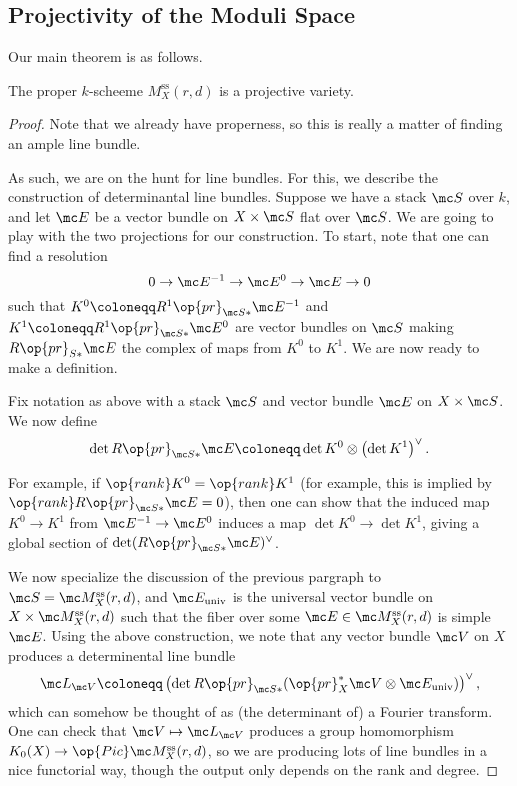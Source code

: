 \documentclass{article}
\begin{document}
\subsection{Projectivity of the Moduli Space}
Our main theorem is as follows.
\begin{theorem}
    The proper $k$-scheeme $M_X^{\mathrm{ss}}(r,d)$ is a projective variety.
\end{theorem}
\begin{proof}
    Note that we already have properness, so this is really a matter of finding an ample line bundle.
    
    As such, we are on the hunt for line bundles. For this, we describe the construction of determinantal line bundles. Suppose we have a stack $\mc S$ over $k$, and let $\mc E$ be a vector bundle on $X\times\mc S$ flat over $\mc S$. We are going to play with the two projections for our construction. To start, note that one can find a resolution
    \[0\to\mc E^{-1}\to\mc E^0\to\mc E\to0\]
    such that $K^0\coloneqq R^1\op{pr}_{\mc S*}\mc E^{-1}$ and $K^1\coloneqq R^1\op{pr}_{\mc S*}\mc E^0$ are vector bundles on $\mc S$ making $R\op{pr}_{S*}\mc E$ the complex of maps from $K^0$ to $K^1$. We are now ready to make a definition.
    \begin{definition}
        Fix notation as above with a stack $\mc S$ and vector bundle $\mc E$ on $X\times\mc S$. We now define
        \[\det R\op{pr}_{\mc S*}\mc E\coloneqq\det K^0\otimes\left(\det K^1\right)^\lor.\]
    \end{definition}
    \begin{remark}
        For example, if $\op{rank}K^0=\op{rank}K^1$ (for example, this is implied by $\op{rank}R\op{pr}_{\mc S*}\mc E=0$), then one can show that the induced map $K^0\to K^1$ from $\mc E^{-1}\to\mc E^0$ induces a map $\det K^0\to\det K^1$, giving a global section of $\det(R\op{pr}_{\mc S*}\mc E)^\lor$.
    \end{remark}
    We now specialize the discussion of the previous pargraph to $\mc S=\mc M^{\mathrm{ss}}_X(r,d)$, and $\mc E_{\mathrm{univ}}$ is the universal vector bundle on $X\times\mc M_X^{\mathrm{ss}}(r,d)$ such that the fiber over some $\mc E\in\mc M_X^{\mathrm{ss}}(r,d)$ is simple $\mc E$. Using the above construction, we note that any vector bundle $\mc V$ on $X$ produces a determinental line bundle
    \[\mc L_{\mc V}\coloneqq\left(\det R\op{pr}_{\mc S*}(\op{pr}_X^*\mc V\otimes\mc E_{\mathrm{univ}})\right)^\lor,\]
    which can somehow be thought of as (the determinant of) a Fourier transform. One can check that $\mc V\mapsto\mc L_{\mc V}$ produces a group homomorphism $K_0(X)\to\op{Pic}\mc M_X^{\mathrm{ss}}(r,d)$, so we are producing lots of line bundles in a nice functorial way, though the output only depends on the rank and degree.
    

\end{proof}
\end{document}
